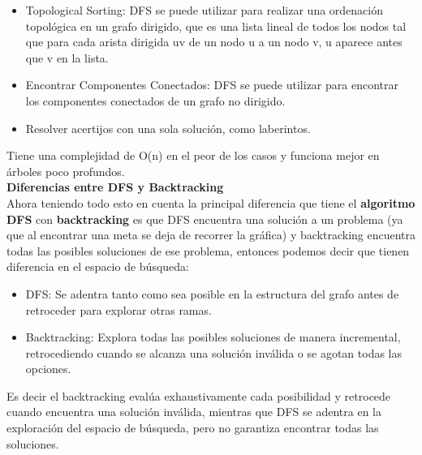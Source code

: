 \begin{itemize}
\begin{itemize}
        \item Topological Sorting: DFS se puede utilizar para realizar una ordenación topológica en un grafo dirigido, que es una lista lineal de todos los nodos tal que para cada arista dirigida uv de un nodo u a un nodo v, u aparece antes que v en la lista.

        \item Encontrar Componentes Conectados: DFS se puede utilizar para encontrar los componentes conectados de un grafo no dirigido.

        \item Resolver acertijos con una sola solución, como laberintos.
    \end{itemize}

    \end{itemize}

Tiene una complejidad de O(n) en el peor de los casos y funciona mejor en árboles poco profundos.\\


    \textbf{\large{Diferencias entre DFS y Backtracking}}
    \\
    Ahora teniendo todo esto en cuenta la principal diferencia que tiene el \textbf{algoritmo DFS} con \textbf{backtracking} es que DFS encuentra una solución a un problema (ya que al encontrar una meta se deja de recorrer la gráfica) y backtracking encuentra todas las posibles soluciones de ese problema, entonces podemos decir que tienen diferencia en el espacio de búsqueda:
    \begin{itemize}
        \item DFS: Se adentra tanto como sea posible en la estructura del grafo antes de retroceder para explorar otras ramas.

        \item Backtracking: Explora todas las posibles soluciones de manera incremental, retrocediendo cuando se alcanza una solución inválida o se agotan todas las opciones.
    \end{itemize}

    Es decir el backtracking evalúa exhaustivamente cada posibilidad y retrocede cuando encuentra una solución inválida, mientras que DFS se adentra en la exploración del espacio de búsqueda, pero no garantiza encontrar todas las soluciones.

